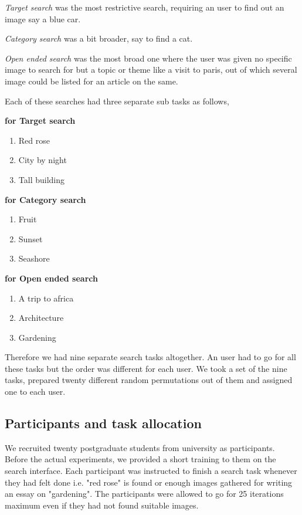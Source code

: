 \documentclass[english]{tktltiki}
\begin{document}
\textit{Target search} was the most restrictive search, requiring an user to find out an image say a blue car.

\textit{Category search} was a bit broader, say to find a cat.

\textit{Open ended search} was the most broad one where the user was given no specific image to search for but a topic or theme like a visit to paris, out of which several image could be listed for an article on the same.

Each of these searches had three separate sub tasks as follows,

\textbf{for Target search}

\begin{enumerate}
  \item Red rose
  \item City by night
  \item Tall building
\end{enumerate}

\textbf{for Category search}

\begin{enumerate}
  \item Fruit
  \item Sunset
  \item Seashore
\end{enumerate}

\textbf{for Open ended search}

\begin{enumerate}
  \item A trip to africa
  \item Architecture
  \item Gardening
\end{enumerate}

Therefore we had nine separate search tasks altogether. An user had to go for all these tasks but the order was different for each user. We took a set of the nine tasks, prepared twenty different random permutations out of them and assigned one to each user.

\subsection{Participants and task allocation}

We recruited twenty postgraduate students from university as participants. Before the actual experiments, we provided a short training to them on the search interface. Each participant was instructed to finish a search task whenever they had felt done i.e. "red rose" is found or enough images gathered for writing an essay on "gardening". The participants were allowed to go for 25 iterations maximum even if they had not found suitable images.
\end{document}
